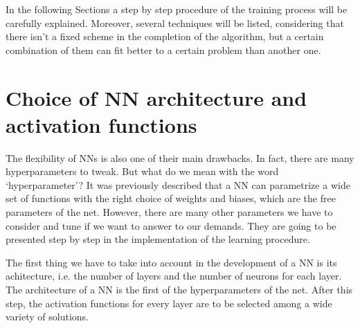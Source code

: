 In the following Sections a step by step procedure of the training process will be carefully explained. Moreover, several techniques will be listed, considering that there isn't a fixed scheme in the completion of the algorithm, but a certain combination of them can fit better to a certain problem than another one.

\section{Choice of NN architecture and activation functions}
The flexibility of NNs is also one of their main drawbacks. In fact, there are many hyperparameters to tweak. But what do we mean with the word `hyperparameter'? It was previously described that a NN can parametrize a wide set of functions with the right choice of weights and biases, which are the free parameters of the net. However, there are many other parameters we have to consider and tune if we want to answer to our demands. They are going to be presented step by step in the implementation of the learning procedure.

The first thing we have to take into account in the development of a NN is its achitecture, i.e. the number of layers and the number of neurons for each layer. The architecture of a NN is the first of the hyperparameters of the net. After this step, the activation functions for every layer are to be selected among a wide variety of solutions.

